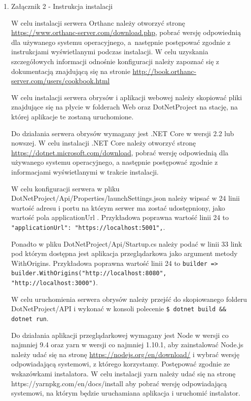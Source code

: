 \documentclass[a4paper,11pt,twoside,openright]{report}
\theoremstyle{definition}
\begin{document}
\begin{enumerate}
\item Załącznik 2 - Instrukcja instalacji

W celu instalacji serwera Orthanc należy otworzyć stronę
\url{https://www.orthanc-server.com/download.php}, pobrać wersję odpowiednią dla
używanego systemu operacyjnego, a~następnie postępować zgodnie z instrukcjami
wyświetlanymi podczas instalacji. W celu uzyskania szczegółowych informacji
odnośnie konfiguracji należy zapoznać się z dokumentacją znajdującą się na stronie
\url{http://book.orthanc-server.com/users/cookbook.html}

W celu instalacji serwera obrysów i aplikacji webowej należy skopiować pliki
znajdujące się na płycie w folderach Web oraz DotNetProject na stację,
na której aplikacje te zostaną uruchomione.

Do działania serwera obrysów wymagany jest .NET Core w wersji 2.2 lub nowszej.
W celu instalacji .NET Core należy otworzyć stronę \url{https://dotnet.microsoft.com/download},
pobrać wersję odpowiednią dla używanego systemu operacyjnego, a następnie
postępować zgodnie z informacjami wyświetlanymi w trakcie instalacji.

W celu konfiguracji serwera w pliku DotNetProject/Api/Properties/launchSettings.json
należy wipsać w 24 linii  wartość adresu i portu na którym serwer ma zostać
udostępniony, jako wartość pola applicationUrl . Przykładowa poprawna wartość
linii 24 to\texttt{ "applicationUrl": "https://localhost:5001",}.

Ponadto w pliku DotNetProject/Api/Startup.cs należy podać w linii 33 link pod
którym dostępna jest aplikacja przeglądarkowa jako argument metody WithOrigins.
Przykładowa poprawna wartość linii 24 to
\texttt{builder => builder.WithOrigins("http://localhost:8080", "http://localhost:3000")}.

W celu uruchomienia serwera obrysów należy przejść do skopiowanego folderu
DotNetProject/API i wykonać w konsoli polecenie \texttt{\$ dotnet build \&\& dotnet run}.

Do działania aplikacji przeglądarkowej wymagany jest Node w wersji co najmniej
9.4 oraz yarn w wersji co najmniej 1.10.1, aby zainstalować Node.js należy udać
się na stronę \url{https://nodejs.org/en/download/} i wybrać wersję odpowiadającą
systemowi, z którego korzystamy. Postępować zgodnie ze wskazówkami instalatora.
W celu instalacji yarn należy udać się na stronę https://yarnpkg.com/en/docs/install
aby pobrać wersję odpowiadającą systemowi, na którym będzie uruchamiana aplikacja
i uruchomić instalator.


\end{enumerate}
\end{document}
